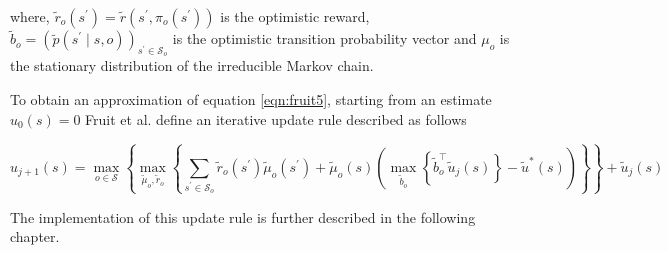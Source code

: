 where, $ \tilde{r}_o(s^\prime) =  \tilde{r}(s^\prime, \pi_o(s^\prime))$ is the optimistic reward, $\tilde{b}_o = (\tilde{p}(s^\prime \mid s, o))_{s^\prime \in \mathcal{S}_o}$ is the optimistic transition probability vector and $\mu_o$ is the stationary distribution of the irreducible Markov chain.

To obtain an approximation of equation \ref{eqn:fruit5}, starting from an estimate $u_0(s) = 0$ Fruit et al. define an iterative update rule described as follows

\begin{equation}
    \label{eqn:fruit7}
    u_{j+1}(s) = \max_{o \in \mathcal{S}} \left\{ \max_{\tilde{\mu}_o, \tilde{r}_o} \left\{ \sum_{s^\prime \in \mathcal{S}_o} \tilde{r}_o(s^\prime) \tilde{\mu}_o(s^\prime) + \tilde{\mu}_o(s) \left( \max_{\tilde{b}_o}\left\{ \tilde{b}_o^\top \tilde{u}_j(s) \right\} - \tilde{u}^*(s) \right) \right\} \right\} + \tilde{u}_j(s)
\end{equation}

The implementation of this update rule is further described in the following chapter.
